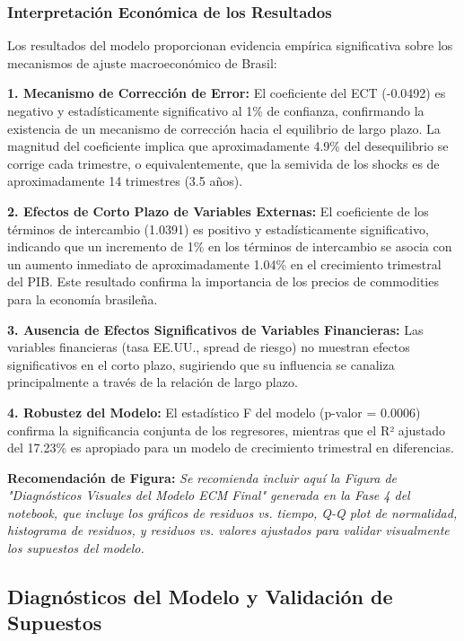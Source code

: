 \documentclass[3p,11pt]{elsarticle}
\begin{document}
\subsubsection{Interpretación Económica de los Resultados}

Los resultados del modelo proporcionan evidencia empírica significativa sobre los mecanismos de ajuste macroeconómico de Brasil:

\textbf{1. Mecanismo de Corrección de Error:} El coeficiente del ECT (-0.0492) es negativo y estadísticamente significativo al 1\% de confianza, confirmando la existencia de un mecanismo de corrección hacia el equilibrio de largo plazo. La magnitud del coeficiente implica que aproximadamente 4.9\% del desequilibrio se corrige cada trimestre, o equivalentemente, que la semivida de los shocks es de aproximadamente 14 trimestres (3.5 años).

\textbf{2. Efectos de Corto Plazo de Variables Externas:} El coeficiente de los términos de intercambio (1.0391) es positivo y estadísticamente significativo, indicando que un incremento de 1\% en los términos de intercambio se asocia con un aumento inmediato de aproximadamente 1.04\% en el crecimiento trimestral del PIB. Este resultado confirma la importancia de los precios de commodities para la economía brasileña.

\textbf{3. Ausencia de Efectos Significativos de Variables Financieras:} Las variables financieras (tasa EE.UU., spread de riesgo) no muestran efectos significativos en el corto plazo, sugiriendo que su influencia se canaliza principalmente a través de la relación de largo plazo.

\textbf{4. Robustez del Modelo:} El estadístico F del modelo (p-valor = 0.0006) confirma la significancia conjunta de los regresores, mientras que el R² ajustado del 17.23\% es apropiado para un modelo de crecimiento trimestral en diferencias.

\textbf{Recomendación de Figura:} \textit{Se recomienda incluir aquí la Figura de "Diagnósticos Visuales del Modelo ECM Final" generada en la Fase 4 del notebook, que incluye los gráficos de residuos vs. tiempo, Q-Q plot de normalidad, histograma de residuos, y residuos vs. valores ajustados para validar visualmente los supuestos del modelo.}

\subsection{Diagnósticos del Modelo y Validación de Supuestos}
\end{document}
